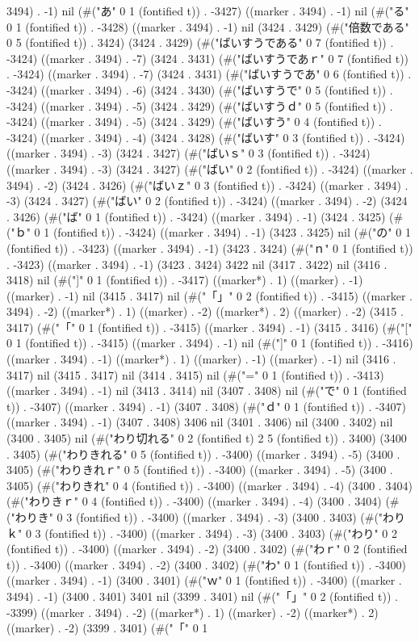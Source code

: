 3494) . -1) nil (#("あ" 0 1 (fontified t)) . -3427) ((marker . 3494) . -1) nil (#("る" 0 1 (fontified t)) . -3428) ((marker . 3494) . -1) nil (3424 . 3429) (#("倍数である" 0 5 (fontified t)) . 3424) (3424 . 3429) (#("ばいすうである" 0 7 (fontified t)) . -3424) ((marker . 3494) . -7) (3424 . 3431) (#("ばいすうであｒ" 0 7 (fontified t)) . -3424) ((marker . 3494) . -7) (3424 . 3431) (#("ばいすうであ" 0 6 (fontified t)) . -3424) ((marker . 3494) . -6) (3424 . 3430) (#("ばいすうで" 0 5 (fontified t)) . -3424) ((marker . 3494) . -5) (3424 . 3429) (#("ばいすうｄ" 0 5 (fontified t)) . -3424) ((marker . 3494) . -5) (3424 . 3429) (#("ばいすう" 0 4 (fontified t)) . -3424) ((marker . 3494) . -4) (3424 . 3428) (#("ばいす" 0 3 (fontified t)) . -3424) ((marker . 3494) . -3) (3424 . 3427) (#("ばいｓ" 0 3 (fontified t)) . -3424) ((marker . 3494) . -3) (3424 . 3427) (#("ばい" 0 2 (fontified t)) . -3424) ((marker . 3494) . -2) (3424 . 3426) (#("ばいｚ" 0 3 (fontified t)) . -3424) ((marker . 3494) . -3) (3424 . 3427) (#("ばい" 0 2 (fontified t)) . -3424) ((marker . 3494) . -2) (3424 . 3426) (#("ば" 0 1 (fontified t)) . -3424) ((marker . 3494) . -1) (3424 . 3425) (#("ｂ" 0 1 (fontified t)) . -3424) ((marker . 3494) . -1) (3423 . 3425) nil (#("の" 0 1 (fontified t)) . -3423) ((marker . 3494) . -1) (3423 . 3424) (#("ｎ" 0 1 (fontified t)) . -3423) ((marker . 3494) . -1) (3423 . 3424) 3422 nil (3417 . 3422) nil (3416 . 3418) nil (#("]" 0 1 (fontified t)) . -3417) ((marker*) . 1) ((marker) . -1) ((marker) . -1) nil (3415 . 3417) nil (#("「」" 0 2 (fontified t)) . -3415) ((marker . 3494) . -2) ((marker*) . 1) ((marker) . -2) ((marker*) . 2) ((marker) . -2) (3415 . 3417) (#("「" 0 1 (fontified t)) . -3415) ((marker . 3494) . -1) (3415 . 3416) (#("[" 0 1 (fontified t)) . -3415) ((marker . 3494) . -1) nil (#("]" 0 1 (fontified t)) . -3416) ((marker . 3494) . -1) ((marker*) . 1) ((marker) . -1) ((marker) . -1) nil (3416 . 3417) nil (3415 . 3417) nil (3414 . 3415) nil (#("=" 0 1 (fontified t)) . -3413) ((marker . 3494) . -1) nil (3413 . 3414) nil (3407 . 3408) nil (#("で" 0 1 (fontified t)) . -3407) ((marker . 3494) . -1) (3407 . 3408) (#("ｄ" 0 1 (fontified t)) . -3407) ((marker . 3494) . -1) (3407 . 3408) 3406 nil (3401 . 3406) nil (3400 . 3402) nil (3400 . 3405) nil (#("わり切れる" 0 2 (fontified t) 2 5 (fontified t)) . 3400) (3400 . 3405) (#("わりきれる" 0 5 (fontified t)) . -3400) ((marker . 3494) . -5) (3400 . 3405) (#("わりきれｒ" 0 5 (fontified t)) . -3400) ((marker . 3494) . -5) (3400 . 3405) (#("わりきれ" 0 4 (fontified t)) . -3400) ((marker . 3494) . -4) (3400 . 3404) (#("わりきｒ" 0 4 (fontified t)) . -3400) ((marker . 3494) . -4) (3400 . 3404) (#("わりき" 0 3 (fontified t)) . -3400) ((marker . 3494) . -3) (3400 . 3403) (#("わりｋ" 0 3 (fontified t)) . -3400) ((marker . 3494) . -3) (3400 . 3403) (#("わり" 0 2 (fontified t)) . -3400) ((marker . 3494) . -2) (3400 . 3402) (#("わｒ" 0 2 (fontified t)) . -3400) ((marker . 3494) . -2) (3400 . 3402) (#("わ" 0 1 (fontified t)) . -3400) ((marker . 3494) . -1) (3400 . 3401) (#("ｗ" 0 1 (fontified t)) . -3400) ((marker . 3494) . -1) (3400 . 3401) 3401 nil (3399 . 3401) nil (#("「」" 0 2 (fontified t)) . -3399) ((marker . 3494) . -2) ((marker*) . 1) ((marker) . -2) ((marker*) . 2) ((marker) . -2) (3399 . 3401) (#("「" 0 1 